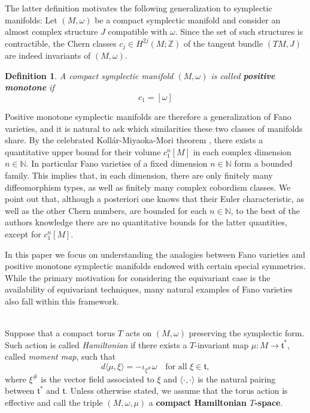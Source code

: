 \documentclass[12pt,a4paper]{amsart}
\newcommand{\ZZ}{\mathbb{Z}}
\newcommand{\NN}{\mathbb{N}}
\theoremstyle{plain}
\newtheorem{defn}[thm]{Definition}
\theoremstyle{definition}
\begin{document}
The latter definition motivates the following generalization to symplectic manifolds:
Let $(M,\omega)$ be a compact symplectic manifold and consider an almost complex structure $J$ compatible with $\omega$. 
Since the set of such structures is contractible, the Chern classes $c_j\in H^{2j}(M;\ZZ)$ of the tangent bundle $(TM,J)$ are indeed invariants of $(M,\omega)$.
\begin{defn}
A compact symplectic manifold $(M,\omega)$ is called \textbf{positive monotone} if
\begin{equation}\label{positive monotone}
c_1=[\omega]
\end{equation} 
\end{defn}
Positive monotone symplectic manifolds are therefore a generalization of Fano varieties, and it is natural to ask which similarities these two classes of manifolds share. 
By the celebrated 
Koll\'ar-Miyaoka-Mori theorem \cite[Theorem 0.2]{MR1189503}, there exists a quantitative upper bound for their volume $c_1^n[M]$ in each complex dimension $n\in \NN$. In particular 
Fano varieties of a fixed dimension $n\in \NN$ form a bounded family. This implies that, in each dimension, there are only finitely many diffeomorphism types, as well as finitely many complex cobordism classes. 
We point out that, although a posteriori one knows that their Euler characteristic, as well as the other Chern numbers, are bounded for each $n\in \NN$, to the best of the authors knowledge there are no
quantitative bounds for the latter quantities, except for $c_1^n[M]$. 

In this paper we focus on understanding the analogies between Fano varieties and positive monotone symplectic manifolds endowed with certain special symmetries. 
While the primary motivation for considering the equivariant case is the availability of equivariant techniques, many natural examples of Fano varieties also fall within this framework.\\$\;$

Suppose that a compact torus $T$ acts on $(M,\omega)$ preserving the symplectic form.
Such action is called \textit{Hamiltonian} 
 if there exists a $T$-invariant map $\mu\colon M \to \mathfrak{t}^*$, called \textit{moment map}, such that 
\begin{equation}\label{def moment map}
d\langle \mu, \xi \rangle = - \iota_{\xi^\#} \omega \quad \text{for all  }\xi \in \mathfrak{t},
\end{equation}
where $\xi^\#$ is the vector field associated to $\xi$ and $\langle \cdot , \cdot \rangle$ is the natural pairing between $\mathfrak{t}^*$ and $\mathfrak{t}$. Unless otherwise stated, we assume that the torus action is effective and call the triple $(M,\omega,\mu)$ a \textbf{compact Hamiltonian $T$-space}. 
\end{document}
